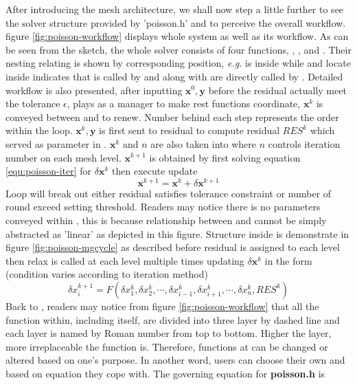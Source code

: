 After introducing the mesh architecture, we shall now step a little further to see the solver structure provided by 'poisson.h' and to perceive the overall workflow. figure \ref{fig:poisson-workflow} displays whole system as well as its workflow. As can be seen from the sketch, the whole solver consists of four functions, , ,  and . Their nesting relating is shown by corresponding position, \emph{e.g.}  is inside  while  and  locate inside  indicates that  is called by  and  along with  are directly called by . Detailed workflow is also presented, after inputting $ \mathbf{x}^0, \mathbf{y}$ before the residual actually meet the tolerance $\epsilon$,  plays as a manager to make rest functions coordinate, $ \mathbf{x}^k$ is conveyed between  and  to renew. Number behind each step represents the order within the loop. $ \mathbf{x}^k, \mathbf{y}$ is first sent to residual to compute residual $RES^k$ which served as parameter in . $ \mathbf{x}^k$ and $n$ are also taken into  where $n$ controls iteration number on each mesh level. $ \mathbf{x}^{k+1}$ is obtained by first solving equation \ref{equ:poisson-iter} for $\delta \mathbf{x}^k$ then execute update
\begin{equation}
  \mathbf{x}^{k+1} = \mathbf{x}^k + \delta \mathbf{x}^{k+1}
\end{equation}
Loop will break out either residual satisfies tolerance constraint or number of round exceed setting threshold. Readers may notice there is no parameters conveyed within , this is because relationship between  and  cannot be simply abstracted as 'linear' as depicted in this figure. Structure inside  is demonstrate in figure \ref{fig:poisson-mgcycle} as described before residual is assigned to each level then relax is called at each level multiple times updating $\delta \mathbf{x}^k$ in the form (condition varies according to iteration method)
\begin{equation}\label{equ:poisson-indirect}
  \delta x^{k+1}_i = F(\delta x^k_1,\delta x^k_2,\cdots,\delta x^k_{i-1},\delta x^k_{i+1},\cdots,\delta x_n^k, RES^k)
\end{equation}
Back to , readers may notice from figure \ref{fig:poisson-workflow} that all the function within, including  itself, are divided into three layer by dashed line and each layer is named by Roman number from top to bottom. Higher the layer, more irreplaceable the function is. Therefore, functions at  can be changed or altered based on one's purpose. In another word, users can choose their own  and  based on equation they cope with. The governing equation for \textbf{poisson.h} is
